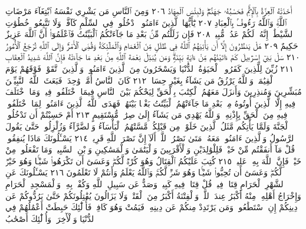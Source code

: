 أَخَذَتْهُ ٱلْعِزَّةُ بِٱلْإِثْمِۚ فَحَسْبُهُۥ جَهَنَّمُۖ وَلَبِئْسَ
ٱلْمِهَادُ ٢٠٦ وَمِنَ ٱلنَّاسِ مَن يَشْرِي نَفْسَهُ ٱبْتِغَآءَ
مَرْضَاتِ ٱللَّهِۚ وَٱللَّهُ رَءُوفُۢ بِٱلْعِبَادِ ٢٠٧ يَٰٓأَيُّهَا ٱلَّذِينَ
ءَامَنُوا۟ ٱدْخُلُوا۟ فِي ٱلسِّلْمِ كَآفَّةࣰ وَلَا تَتَّبِعُوا۟ خُطُوَٰتِ
ٱلشَّيْطَٰنِۚ إِنَّهُۥ لَكُمْ عَدُوࣱّ مُّبِينࣱ ٢٠٨ فَإِن زَلَلْتُم مِّنۢ بَعْدِ
مَا جَآءَتْكُمُ ٱلْبَيِّنَٰتُ فَٱعْلَمُوٓا۟ أَنَّ ٱللَّهَ عَزِيزٌ حَكِيمٌ ٢٠٩
هَلْ يَنظُرُونَ إِلَّآ أَن يَأْتِيَهُمُ ٱللَّهُ فِي ظُلَلࣲ مِّنَ ٱلْغَمَامِ
وَٱلْمَلَٰٓئِكَةُ وَقُضِيَ ٱلْأَمْرُۚ وَإِلَى ٱللَّهِ تُرْجَعُ ٱلْأُمُورُ ٢١٠
سَلْ بَنِيٓ إِسْرَٰٓءِيلَ كَمْ ءَاتَيْنَٰهُم مِّنْ ءَايَةِۭ بَيِّنَةࣲۗ وَمَن يُبَدِّلْ نِعْمَةَ
ٱللَّهِ مِنۢ بَعْدِ مَا جَآءَتْهُ فَإِنَّ ٱللَّهَ شَدِيدُ ٱلْعِقَابِ ٢١١ زُيِّنَ
لِلَّذِينَ كَفَرُوا۟ ٱلْحَيَوٰةُ ٱلدُّنْيَا وَيَسْخَرُونَ مِنَ ٱلَّذِينَ ءَامَنُوا۟ۘ وَٱلَّذِينَ
ٱتَّقَوْا۟ فَوْقَهُمْ يَوْمَ ٱلْقِيَٰمَةِۗ وَٱللَّهُ يَرْزُقُ مَن يَشَآءُ بِغَيْرِ حِسَابࣲ ٢١٢
كَانَ ٱلنَّاسُ أُمَّةࣰ وَٰحِدَةࣰ فَبَعَثَ ٱللَّهُ ٱلنَّبِيِّـۧنَ مُبَشِّرِينَ
وَمُنذِرِينَ وَأَنزَلَ مَعَهُمُ ٱلْكِتَٰبَ بِٱلْحَقِّ لِيَحْكُمَ بَيْنَ ٱلنَّاسِ
فِيمَا ٱخْتَلَفُوا۟ فِيهِۚ وَمَا ٱخْتَلَفَ فِيهِ إِلَّا ٱلَّذِينَ أُوتُوهُ مِنۢ بَعْدِ
مَا جَآءَتْهُمُ ٱلْبَيِّنَٰتُ بَغْيَۢا بَيْنَهُمْۖ فَهَدَى ٱللَّهُ ٱلَّذِينَ ءَامَنُوا۟
لِمَا ٱخْتَلَفُوا۟ فِيهِ مِنَ ٱلْحَقِّ بِإِذْنِهِۦۗ وَٱللَّهُ يَهْدِي مَن يَشَآءُ
إِلَىٰ صِرَٰطࣲ مُّسْتَقِيمٍ ٢١٣ أَمْ حَسِبْتُمْ أَن تَدْخُلُوا۟ ٱلْجَنَّةَ وَلَمَّا
يَأْتِكُم مَّثَلُ ٱلَّذِينَ خَلَوْا۟ مِن قَبْلِكُمۖ مَّسَّتْهُمُ ٱلْبَأْسَآءُ وَٱلضَّرَّآءُ
وَزُلْزِلُوا۟ حَتَّىٰ يَقُولَ ٱلرَّسُولُ وَٱلَّذِينَ ءَامَنُوا۟ مَعَهُۥ مَتَىٰ نَصْرُ
ٱللَّهِۗ أَلَآ إِنَّ نَصْرَ ٱللَّهِ قَرِيبࣱ ٢١٤ يَسْـَٔلُونَكَ مَاذَا يُنفِقُونَۖ قُلْ
مَآ أَنفَقْتُم مِّنْ خَيْرࣲ فَلِلْوَٰلِدَيْنِ وَٱلْأَقْرَبِينَ وَٱلْيَتَٰمَىٰ وَٱلْمَسَٰكِينِ
وَٱبْنِ ٱلسَّبِيلِۗ وَمَا تَفْعَلُوا۟ مِنْ خَيْرࣲ فَإِنَّ ٱللَّهَ بِهِۦ عَلِيمࣱ ٢١٥
كُتِبَ عَلَيْكُمُ ٱلْقِتَالُ وَهُوَ كُرْهࣱ لَّكُمْۖ وَعَسَىٰٓ أَن تَكْرَهُوا۟
شَيْـࣰٔا وَهُوَ خَيْرࣱ لَّكُمْۖ وَعَسَىٰٓ أَن تُحِبُّوا۟ شَيْـࣰٔا وَهُوَ شَرࣱّ
لَّكُمْۚ وَٱللَّهُ يَعْلَمُ وَأَنتُمْ لَا تَعْلَمُونَ ٢١٦ يَسْـَٔلُونَكَ عَنِ ٱلشَّهْرِ
ٱلْحَرَامِ قِتَالࣲ فِيهِۖ قُلْ قِتَالࣱ فِيهِ كَبِيرࣱۚ وَصَدٌّ عَن سَبِيلِ
ٱللَّهِ وَكُفْرُۢ بِهِۦ وَٱلْمَسْجِدِ ٱلْحَرَامِ وَإِخْرَاجُ أَهْلِهِۦ مِنْهُ
أَكْبَرُ عِندَ ٱللَّهِۚ وَٱلْفِتْنَةُ أَكْبَرُ مِنَ ٱلْقَتْلِۗ وَلَا يَزَالُونَ
يُقَٰتِلُونَكُمْ حَتَّىٰ يَرُدُّوكُمْ عَن دِينِكُمْ إِنِ ٱسْتَطَٰعُوا۟ۚ وَمَن
يَرْتَدِدْ مِنكُمْ عَن دِينِهِۦ فَيَمُتْ وَهُوَ كَافِرࣱ فَأُو۟لَٰٓئِكَ
حَبِطَتْ أَعْمَٰلُهُمْ فِي ٱلدُّنْيَا وَٱلْأٓخِرَةِۖ وَأُو۟لَٰٓئِكَ أَصْحَٰبُ
